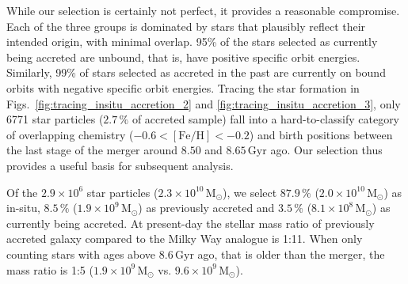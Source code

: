 \documentclass[fleqn,usenatbib]{mnras}
\begin{document}
While our selection is certainly not perfect, it provides a reasonable compromise. Each of the three groups is dominated by stars that plausibly reflect their intended origin, with minimal overlap. 95\% of the stars selected as currently being accreted are unbound, that is, have positive specific orbit energies. Similarly, 99\% of stars selected as accreted in the past are currently on bound orbits with negative specific orbit energies. Tracing the star formation in Figs.~\ref{fig:tracing_insitu_accretion_2} and \ref{fig:tracing_insitu_accretion_3}, only 6771 star particles ($2.7\,\%$ of accreted sample) fall into a hard-to-classify category of overlapping chemistry ($-0.6 < \mathrm{[Fe/H]} < -0.2$) and birth positions between the last stage of the merger around $8.50$ and $8.65\,\mathrm{Gyr}$ ago. Our selection thus provides a useful basis for subsequent analysis.

Of the $2.9 \times 10^6$ star particles ($2.3 \times 10^{10}\,\mathrm{M_\odot}$), we select $87.9\,\mathrm{\%}$ ($2.0 \times 10^{10}\,\mathrm{M_\odot}$) as in-situ, $8.5\,\mathrm{\%}$ ($1.9 \times 10^{9}\,\mathrm{M_\odot}$) as previously accreted and $3.5\,\mathrm{\%}$ ($8.1 \times 10^{8}\,\mathrm{M_\odot}$) as currently being accreted. At present-day the stellar mass ratio of previously accreted galaxy compared to the Milky Way analogue is 1:11. When only counting stars with ages above $8.6\,\mathrm{Gyr}$ ago, that is older than the merger, the mass ratio is 1:5 ($1.9 \times 10^{9}\,\mathrm{M_\odot}$ vs. $9.6 \times 10^{9}\,\mathrm{M_\odot}$).
\end{document}
